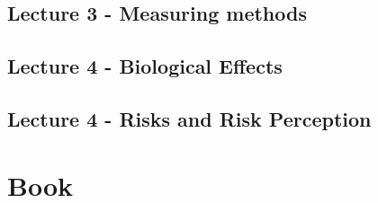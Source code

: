 \documentclass{report}
\begin{document}
\chapter{Lecture 3 - Measuring methods}

\chapter{Lecture 4 - Biological Effects}

\chapter{Lecture 4 - Risks and Risk Perception}

\part{Book}
\end{document}
